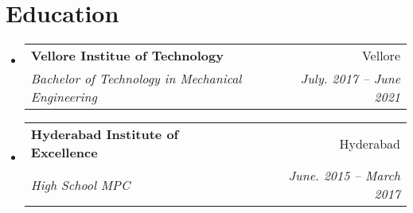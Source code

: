 \documentclass[letterpaper,11pt]{article}
\makeatletter
\newcommand{\resumeSubheading}[4]{
  \vspace{-2pt}\item
    \begin{tabular*}{0.97\textwidth}[t]{l@{\extracolsep{\fill}}r}
      \textbf{#1} & #2 \\
      \textit{\small#3} & \textit{\small #4} \\
    \end{tabular*}\vspace{-7pt}
}
\newcommand{\resumeSubHeadingListStart}{\begin{itemize}[leftmargin=0.15in, label={}]}
\newcommand{\resumeSubHeadingListEnd}{\end{itemize}}
\makeatother
\begin{document}
\section{Education}
  \resumeSubHeadingListStart
    \resumeSubheading
      {Vellore Institue of Technology}{Vellore}
      {Bachelor of Technology in Mechanical Engineering}{July. 2017 -- June 2021}
    \resumeSubheading
      {Hyderabad Institute of Excellence}{Hyderabad}
      {High School MPC}{June. 2015 -- March 2017}
  \resumeSubHeadingListEnd


%



\end{document}
